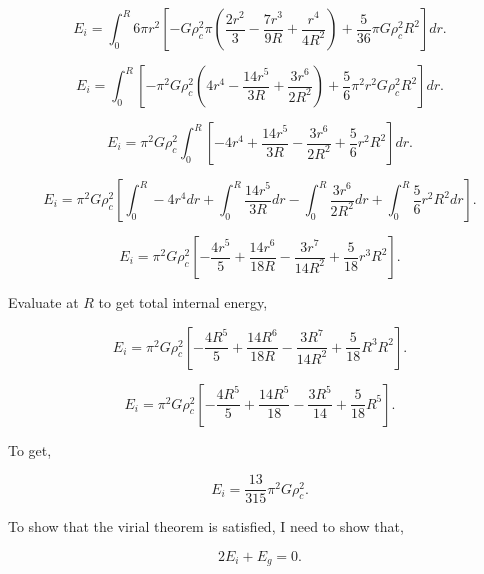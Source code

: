 \documentclass[12pt]{article}
\begin{document}
\begin{equation}
E_i = \int_0^R 6\pi r^2 \left[ -G\rho_c^2\pi \left( \frac{2r^2}{3} - \frac{7r^3}{9R}  + \frac{r^4}{4R^2}\right) + \frac{5}{36}\pi G \rho_c^2R^2\right]dr. 
\end{equation}


\begin{equation}
E_i = \int_0^R \left[ -\pi^2G\rho_c^2 \left( 4r^4 - \frac{14r^5}{3R}  + \frac{3r^6}{2R^2}\right) + \frac{5}{6}\pi^2 r^2 G \rho_c^2R^2\right]dr. 
\end{equation}

\begin{equation}
E_i = \pi^2G\rho_c^2 \int_0^R   \left[ - 4r^4 + \frac{14r^5}{3R}  - \frac{3r^6}{2R^2}+ \frac{5}{6}r^2 R^2\right]dr. 
\end{equation}


\begin{equation}
E_i = \pi^2G\rho_c^2   \left[ \int_0^R - 4r^4 dr +  \int_0^R \frac{14r^5}{3R}dr  -  \int_0^R\frac{3r^6}{2R^2}dr +  \int_0^R \frac{5}{6}r^2 R^2dr\right]. 
\end{equation}


\begin{equation}
E_i = \pi^2G\rho_c^2   \left[- \frac{4r^5}{5} +  \frac{14r^6}{18R}  -  \frac{3r^7}{14R^2} +  \frac{5}{18}r^3 R^2\right]. 
\end{equation}


\noindent Evaluate at $R$ to get total internal energy, 

\begin{equation}
E_i = \pi^2G\rho_c^2   \left[- \frac{4R^5}{5} +  \frac{14R^6}{18R}  -  \frac{3R^7}{14R^2} +  \frac{5}{18}R^3 R^2\right]. 
\end{equation}

\begin{equation}
E_i = \pi^2G\rho_c^2   \left[- \frac{4R^5}{5} +  \frac{14R^5}{18}  -  \frac{3R^5}{14} +  \frac{5}{18}R^5\right]. 
\end{equation}

\noindent To get,

\begin{equation}
E_i = \frac{13}{315}\pi^2G\rho_c^2.
\end{equation}

\noindent To show that the virial theorem is satisfied, I need to show that,

\begin{equation}
2E_i + E_g = 0.
\end{equation}
\end{document}
